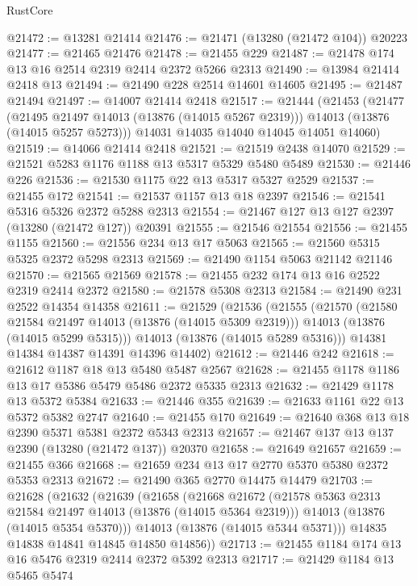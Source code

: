 \begin{lexlean}{RustCore}
\begin{coremodule}
@21472 := @13281 @21414
@21476 := @21471 (@13280 (@21472 @104)) @20223
@21477 := @21465 @21476
@21478 := @21455 @229
@21487 := @21478 @174 @13 @16 @2514 @2319 @2414 @2372 @5266 @2313
@21490 := @13984 @21414 @2418 @13
@21494 := @21490 @228 @2514 @14601 @14605
@21495 := @21487 @21494
@21497 := @14007 @21414 @2418
@21517 := @21444
    (@21453
      (@21477
        (@21495 @21497 @14013 (@13876 (@14015 @5267 @2319)))
        @14013
        (@13876 (@14015 @5257 @5273)))
      @14031
      @14035
      @14040
      @14045
      @14051
      @14060)
@21519 := @14066 @21414 @2418
@21521 := @21519 @2438 @14070
@21529 := @21521 @5283 @1176 @1188 @13 @5317 @5329 @5480 @5489
@21530 := @21446 @226
@21536 := @21530 @1175 @22 @13 @5317 @5327 @2529
@21537 := @21455 @172
@21541 := @21537 @1157 @13 @18 @2397
@21546 := @21541 @5316 @5326 @2372 @5288 @2313
@21554 := @21467 @127 @13 @127 @2397 (@13280 (@21472 @127)) @20391
@21555 := @21546 @21554
@21556 := @21455 @1155
@21560 := @21556 @234 @13 @17 @5063
@21565 := @21560 @5315 @5325 @2372 @5298 @2313
@21569 := @21490 @1154 @5063 @21142 @21146
@21570 := @21565 @21569
@21578 := @21455 @232 @174 @13 @16 @2522 @2319 @2414 @2372
@21580 := @21578 @5308 @2313
@21584 := @21490 @231 @2522 @14354 @14358
@21611 := @21529
    (@21536
      (@21555
        (@21570
          (@21580 @21584 @21497 @14013 (@13876 (@14015 @5309 @2319)))
          @14013
          (@13876 (@14015 @5299 @5315)))
        @14013
        (@13876 (@14015 @5289 @5316)))
      @14381
      @14384
      @14387
      @14391
      @14396
      @14402)
@21612 := @21446 @242
@21618 := @21612 @1187 @18 @13 @5480 @5487 @2567
@21628 := @21455 @1178 @1186 @13 @17 @5386 @5479 @5486 @2372 @5335 @2313
@21632 := @21429 @1178 @13 @5372 @5384
@21633 := @21446 @355
@21639 := @21633 @1161 @22 @13 @5372 @5382 @2747
@21640 := @21455 @170
@21649 := @21640 @368 @13 @18 @2390 @5371 @5381 @2372 @5343 @2313
@21657 := @21467 @137 @13 @137 @2390 (@13280 (@21472 @137)) @20370
@21658 := @21649 @21657
@21659 := @21455 @366
@21668 := @21659 @234 @13 @17 @2770 @5370 @5380 @2372 @5353 @2313
@21672 := @21490 @365 @2770 @14475 @14479
@21703 := @21628
    (@21632
      (@21639
        (@21658
          (@21668
            @21672
            (@21578 @5363 @2313 @21584 @21497 @14013 (@13876 (@14015 @5364 @2319)))
            @14013
            (@13876 (@14015 @5354 @5370)))
          @14013
          (@13876 (@14015 @5344 @5371)))
        @14835
        @14838
        @14841
        @14845
        @14850
        @14856))
@21713 := @21455 @1184 @174 @13 @16 @5476 @2319 @2414 @2372 @5392 @2313
@21717 := @21429 @1184 @13 @5465 @5474

\end{coremodule}
\end{lexlean}
